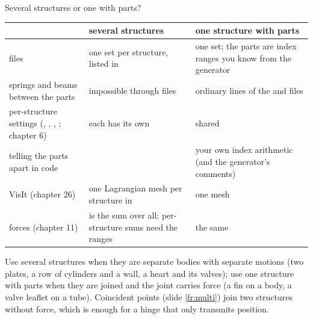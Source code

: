 \documentclass[aspectratio=169,11pt]{beamer}
\begin{document}
\begin{frame}{Several structures or one with parts?}
\label{fr:connect2}
\scriptsize
\begin{tabular}{@{}L{0.3\textwidth}L{0.3\textwidth}L{0.3\textwidth}@{}}
\toprule
 & several structures & one structure with parts\\
\midrule
files & one set per structure, listed in  & one set; the parts are index ranges you know from the generator\\
springs and beams between the parts & impossible through files & ordinary lines of the  and  files\\
per-structure settings (, , , ; chapter 6) & each has its own & shared\\
telling the parts apart in code & \allowbreak{} & your own index arithmetic (and the generator's comments)\\
VisIt (chapter 26) & one Lagrangian mesh per structure in  & one mesh\\
forces (chapter 11) &  is the sum over all; per-structure sums need the ranges & the same\\
\bottomrule
\end{tabular}

\vspace{2mm}
\small Use several structures when they are separate bodies with separate motions (two plates, a row of cylinders and a wall, a heart and its valves); use one structure with parts when they are joined and the joint carries force (a fin on a body, a valve leaflet on a tube). Coincident points (slide \ref{fr:multi}) join two structures without force, which is enough for a hinge that only transmits position.
\end{frame}
\end{document}
